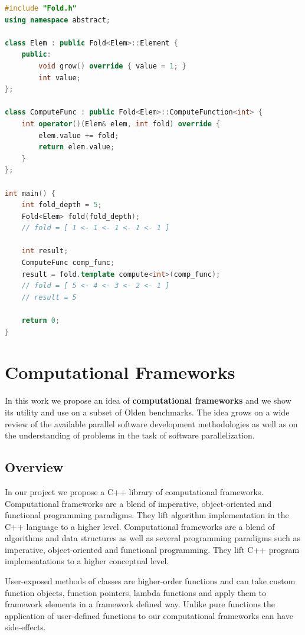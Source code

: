 \begin{minipage}[t]{\linewidth}
\begin{lstlisting}[caption={Left fold computation using our Fold computational framework},label={lst:left_fold_framework},language=C++]
#include "Fold.h"
using namespace abstract;

class Elem : public Fold<Elem>::Element {
    public:
        void grow() override { value = 1; }
        int value;
};

class ComputeFunc : public Fold<Elem>::ComputeFunction<int> {
    int operator()(Elem& elem, int fold) override {
        elem.value += fold;
        return elem.value;
    }
};

int main() {
    int fold_depth = 5;
    Fold<Elem> fold(fold_depth);
    // fold = [ 1 <- 1 <- 1 <- 1 <- 1 ]
    
    int result;
    ComputeFunc comp_func;
    result = fold.template compute<int>(comp_func);
    // fold = [ 5 <- 4 <- 3 <- 2 <- 1 ]
    // result = 5
    
    return 0;
}
\end{lstlisting}
\end{minipage}

\section{Computational Frameworks}
\quad In this work we propose an idea of \textbf{computational frameworks} and we show its utility and use on a subset of Olden benchmarks. The idea grows on a wide review of the available parallel software development methodologies as well as on the understanding of problems in the task of software parallelization.  

\subsection{Overview}
\quad In our project we propose a C++ library of computational frameworks. Computational frameworks are a blend of imperative, object-oriented and functional programming paradigms. They lift algorithm implementation in the C++ language to a higher level.
Computational frameworks are a blend of algorithms and data structures as well as several programming paradigms such as imperative, object-oriented and functional programming. They lift C++ program implementations to a higher conceptual level. 

User-exposed methods of classes are higher-order functions and can take custom function objects, function pointers, lambda functions and apply them to framework elements in a framework defined way. Unlike pure functions the application of user-defined functions to our computational frameworks can have side-effects.

